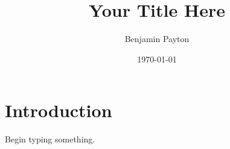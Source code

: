 \documentclass{article} %
\title{Your Title Here} %
\author{Benjamin Payton} %
\date{\today} %
\begin{document}
\maketitle

\section{Introduction}
Begin typing something.
\end{document}
